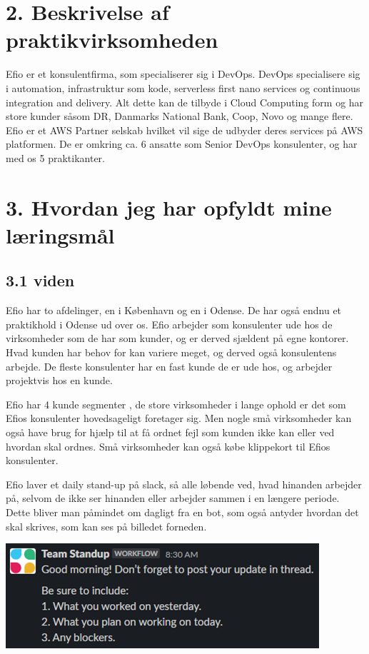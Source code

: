 \documentclass[11pt]{report}
\begin{document}
 

\chapter*{2. Beskrivelse af praktikvirksomheden}
Efio er et konsulentfirma, som specialiserer sig i DevOps. DevOps specialisere sig i automation, infrastruktur som kode, serverless first nano services og continuous integration and delivery. Alt dette kan de tilbyde i Cloud Computing form og har store kunder såsom DR, Danmarks National Bank, Coop, Novo og mange flere.
Efio er et AWS Partner selskab hvilket vil sige de udbyder deres services på AWS platformen. De er omkring ca. 6 ansatte som Senior DevOps konsulenter, og har med os 5 praktikanter.

\chapter*{3. Hvordan jeg har opfyldt mine læringsmål}

\section*{3.1 viden}
Efio har to afdelinger, en i København og en i Odense. De har også endnu et praktikhold i Odense ud over os. 
Efio arbejder som konsulenter ude hos de virksomheder som de har som kunder, og er derved sjældent på egne kontorer. 
Hvad kunden har behov for kan variere meget, og derved også konsulentens arbejde. 
De fleste konsulenter har en fast kunde de er ude hos, og arbejder projektvis hos en kunde. 

Efio har 4 kunde segmenter , de store virksomheder i lange ophold er det som Efios konsulenter hovedsageligt foretager sig. 
Men nogle små virksomheder kan også have brug for hjælp til at få ordnet fejl som kunden ikke kan eller ved hvordan skal ordnes. 
Små virksomheder kan også købe klippekort til Efios konsulenter.

Efio laver et daily stand-up på slack, så alle løbende ved, hvad hinanden arbejder på, 
selvom de ikke ser hinanden eller arbejder sammen i en længere periode. 
Dette bliver man påmindet om dagligt fra en bot, som også antyder hvordan det skal skrives, som kan ses på billedet forneden.
\begin{center}
\includegraphics{standup}
\end{center}
\end{document}
